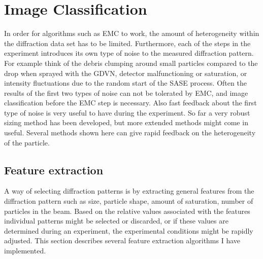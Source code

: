 \chapter{Image Classification}
In order for algorithms such as EMC to work, the amount of heterogeneity within the diffraction data set has to be limited. Furthermore, each of the steps in the experiment introduces its own type of noise to the measured diffraction pattern. For example think of the debris clumping around small particles compared to the drop when sprayed with the GDVN, detector malfunctioning or saturation, or intensity fluctuations due to the random start of the SASE process. Often the results of the first two types of noise can not be tolerated by EMC, and image classification before the EMC step is necessary. Also fast feedback about the first type of noise is very useful to have during the experiment. So far a very robust sizing method has been developed, but more extended methods might come in useful. Several methods shown here can give rapid feedback on the heterogeneity of the particle.


\section{Feature extraction}
A way of selecting diffraction patterns is by extracting general features from the diffraction pattern such as size, particle shape, amount of saturation, number of particles in the beam. Based on the relative values associated with the features individual patterns might be selected or discarded, or if these values are determined during an experiment, the experimental conditions might be rapidly adjusted. This section describes several feature extraction algorithms I have implemented.

